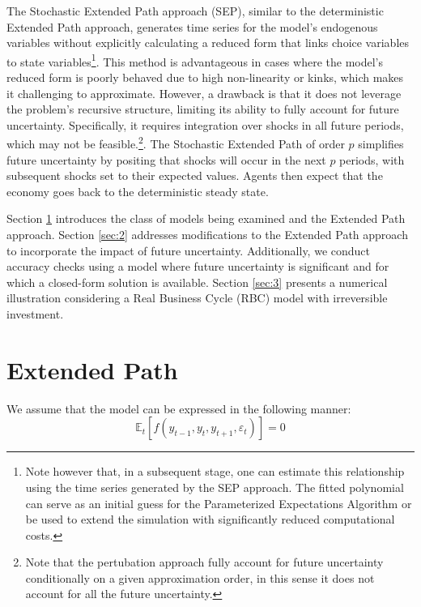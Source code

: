 \documentclass[a4paper,12pt]{amsart}
\begin{document}
The Stochastic Extended Path approach (SEP), similar to the
deterministic Extended Path approach, generates time series for the
model's endogenous variables without explicitly calculating a reduced
form that links choice variables to state variables\footnote{Note
   however that, in a subsequent stage, one can estimate this
   relationship using the time series generated by the SEP
   approach. The fitted polynomial can serve as an initial guess for
   the Parameterized Expectations Algorithm or be used to extend the
   simulation with significantly reduced computational costs.}. This
method is advantageous in cases where the model's reduced form is
poorly behaved due to high non-linearity or kinks, which makes it
challenging to approximate. However, a drawback is that it does not
leverage the problem's recursive structure, limiting its ability to
fully account for future uncertainty. Specifically, it requires
integration over shocks in all future periods, which may not be feasible.\footnote{Note that the pertubation
   approach fully account for future uncertainty conditionally on a
   given approximation order, in this sense it does not account for all
   the future uncertainty.}.
The Stochastic Extended Path of order \( p \) simplifies future
uncertainty by positing that shocks will occur in the next \( p \)
periods, with subsequent shocks set to their expected
values.  Agents then expect that the
economy goes back to the deterministic steady state.\newline

Section \ref{sec:1} introduces the class of models being examined and
the Extended Path approach. Section \ref{sec:2} addresses
modifications to the Extended Path approach to incorporate the impact
of future uncertainty. Additionally, we conduct accuracy checks using
a model where future uncertainty is significant and for which a
closed-form solution is available. Section \ref{sec:3} presents a
numerical illustration considering a Real Business Cycle (RBC) model
with irreversible investment.

\section{Extended Path}\label{sec:1}

We assume that the model can be expressed in the following manner:
\begin{equation}\label{eq:model}
   \mathbb E_t\left[f\left( y_{t-1}, y_t, y_{t+1}, \varepsilon_t \right)\right] = 0
\end{equation}
\end{document}
